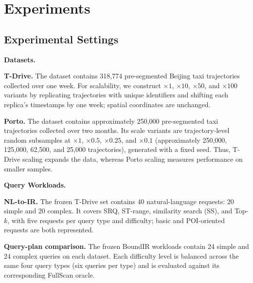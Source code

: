 \newcommand{\expresultplaceholder}[1]{%
  \fbox{\begin{minipage}[c][3.35cm][c]{0.94\linewidth}%
    \centering\small\textbf{Figure placeholder}\par\vspace{3pt}%
    \textbf{#1}%
  \end{minipage}}%
}

\section{Experiments}\label{sec:experiments}

\subsection{Experimental Settings}\label{sec:exp-setup}

\noindent\textbf{Datasets.}

\textbf{T-Drive.} The dataset contains 318,774 pre-segmented Beijing taxi trajectories collected over one week. For scalability, we construct $\times1$, $\times10$, $\times50$, and $\times100$ variants by replicating trajectories with unique identifiers and shifting each replica's timestamps by one week; spatial coordinates are unchanged.

\textbf{Porto.} The dataset contains approximately 250,000 pre-segmented taxi trajectories collected over two months. Its scale variants are trajectory-level random subsamples at $\times1$, $\times0.5$, $\times0.25$, and $\times0.1$ (approximately 250,000, 125,000, 62,500, and 25,000 trajectories), generated with a fixed seed. Thus, T-Drive scaling expands the data, whereas Porto scaling measures performance on smaller samples.

\par\noindent\textbf{Query Workloads.}

\textbf{NL-to-IR.} The frozen T-Drive set contains 40 natural-language requests: 20 simple and 20 complex. It covers SRQ, ST-range, similarity search (SS), and Top-$k$, with five requests per query type and difficulty; basic and POI-oriented requests are both represented.

\textbf{Query-plan comparison.} The frozen BoundIR workloads contain 24 simple and 24 complex queries on each dataset. Each difficulty level is balanced across the same four query types (six queries per type) and is evaluated against its corresponding FullScan oracle.

